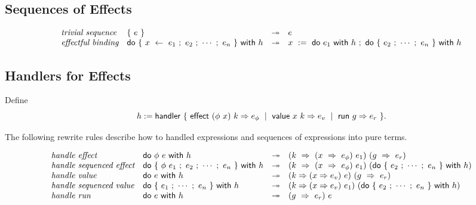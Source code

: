 \documentclass{article}
\begin{document}
\subsection{Sequences of Effects}

\[ \begin{array}{llcl}
  \textit{trivial sequence} &
    \{~e~\} &\twoheadrightarrow& e
  \\
  \textit{effectful binding} &
    \textsf{do}~\{~x~\leftarrow~e_1~;~e_2~;~\cdots~;~e_n~\}~\textsf{with}~h &\twoheadrightarrow&
      x~:=~\textsf{do}~e_1~\textsf{with}~h~;~
      \textsf{do}~\{~e_2~;~\cdots~;~e_n~\}~\textsf{with}~h
\end{array} \]

\subsection{Handlers for Effects}

Define
\[
  h :=
  \textsf{handler}~\{~
    \textsf{effect} ~ (\phi ~ x) ~ k \Rightarrow e_\phi~\mid~
    \textsf{value} ~ x ~ k \Rightarrow e_v~\mid~
    \textsf{run} ~ g \Rightarrow e_r
  ~\}
  .
\]

\noindent
The following rewrite rules describe how to handled expressions and sequences of expressions into pure terms.


\[ \begin{array}{llcl}
  \textit{handle effect} &
  \textsf{do}~\phi~e~\textsf{with}~h &\twoheadrightarrow&
    (k~\Rightarrow~(x~\Rightarrow~e_\phi)~e_1)~
    (g~\Rightarrow~e_r)
  \\
  \textit{handle sequenced effect} &
  \textsf{do}~\{~\phi~e_1~;~e_2~;~\cdots~;~e_n~\}~\textsf{with}~h &\twoheadrightarrow&
    (k~\Rightarrow~(x~\Rightarrow~e_\phi)~e_1)~
    (\textsf{do}~\{~e_2~;~\cdots~;~e_n~\}~\textsf{with}~h)
  \\

  \textit{handle value} &
  \textsf{do}~e~\textsf{with}~h &\twoheadrightarrow&
    (k \Rightarrow (x \Rightarrow e_v) ~ e) ~
    (g~\Rightarrow~e_r)
  \\
  \textit{handle sequenced value} &
  \textsf{do}~\{~e_1~;~\cdots~;~e_n~\}~\textsf{with}~h &\twoheadrightarrow&
    (k \Rightarrow (x \Rightarrow e_v) ~ e_1) ~
    (\textsf{do}~\{~e_2~;~\cdots~;~e_n~\}~\textsf{with}~h)
  \\

  \textit{handle run} &
  \textsf{do}~e~\textsf{with}~h &\twoheadrightarrow&
    (g~\Rightarrow~e_r)~e
\end{array} \]
\end{document}
